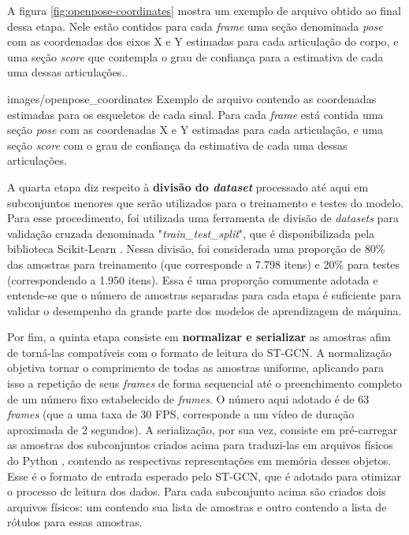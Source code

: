 A figura \ref{fig:openpose-coordinates} mostra um exemplo de arquivo obtido ao final dessa etapa. Nele estão contidos para cada \textit{frame} uma seção denominada \textit{pose} com as coordenadas dos eixos X e Y estimadas para cada articulação do corpo, e uma seção \textit{score} que contempla o grau de confiança para a estimativa de cada uma dessas articulações..

    {images/openpose_coordinates}
    {Exemplo de arquivo contendo as coordenadas estimadas para os esqueletos de cada sinal. Para cada \textit{frame} está contida uma seção \textit{pose} com as coordenadas X e Y estimadas para cada articulação, e uma seção \textit{score} com o grau de confiança da estimativa de cada uma dessas articulações.}

A quarta etapa diz respeito à \textbf{divisão do \textit{dataset}} processado até aqui em subconjuntos menores que serão utilizados para o treinamento e testes do modelo. Para esse procedimento, foi utilizada uma ferramenta de divisão de \textit{datasets} para validação cruzada denominada "\textit{train\_test\_split}", que é disponibilizada pela biblioteca Scikit-Learn \cite{scikit-learn}. Nessa divisão, foi considerada uma proporção de 80\% das amostras para treinamento (que corresponde a 7.798 itens) e 20\% para testes (correspondendo a 1.950 itens). Essa é uma proporção comumente adotada e entende-se que o número de amostras separadas para cada etapa é suficiente para validar o desempenho da grande parte dos modelos de aprendizagem de máquina.

Por fim, a quinta etapa consiste em \textbf{normalizar e serializar} as amostras afim de torná-las compatíveis com o formato de leitura do ST-GCN. A normalização objetiva tornar o comprimento de todas as amostras uniforme, aplicando para isso a repetição de seus \textit{frames} de forma sequencial até o preenchimento completo de um número fixo estabelecido de \textit{frames}. O número aqui adotado é de 63 \textit{frames} (que a uma taxa de 30 FPS, corresponde a um vídeo de duração aproximada de 2 segundos). A serialização, por sua vez, consiste em pré-carregar as amostras dos subconjuntos criados acima para traduzi-las em arquivos físicos do Python \cite{python}, contendo as respectivas representações em memória desses objetos. Esse é o formato de entrada esperado pelo ST-GCN, que é adotado para otimizar o processo de leitura dos dados. Para cada subconjunto acima são criados dois arquivos físicos: um contendo sua lista de amostras e outro contendo a lista de rótulos para essas amostras. 

